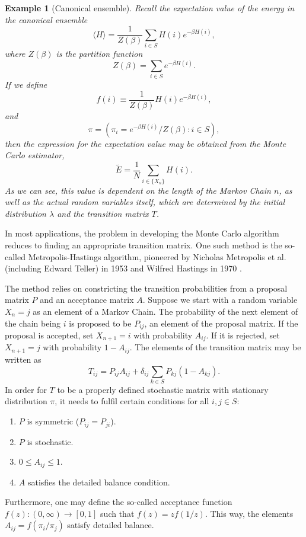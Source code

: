 \documentclass[]{article}
\numberwithin{equation}{section}
\theoremstyle{break}
\newtheorem*{example}{Example}
\newcommand{\bk}{\par\null\par\noindent}
\begin{document}
    \begin{example}[Canonical ensemble]
    Recall the expectation value of the energy in the canonical ensemble
    \[\langle H \rangle = \frac{1}{Z(\beta)}\sum_{i\in S}H(i)e^{-\beta H(i)},\]
    where $Z(\beta)$ is the partition function
    \[Z(\beta) = \sum_{i\in S}e^{-\beta H(i)}.\]
    If we define
    \[f(i) \equiv \frac{1}{Z(\beta)} H(i)e^{-\beta H(i)}, \]
    and
    \[\pi = (\pi_i = e^{-\beta H(i)}/Z(\beta): i\in S),\]
    then the expression for the expectation value may be obtained from the Monte Carlo estimator,
    \[\tilde{E} = \frac{1}{N}\sum_{i\in\{X_n\}}H(i).\]
    As we can see, this value is dependent on the length of the Markov Chain $n$, as well as the actual random variables itself, which are determined by the initial distribution $\lambda$ and the transition matrix $T$.
    \end{example}
\bk
    In most applications, the problem in developing the Monte Carlo algorithm reduces to finding an appropriate transition matrix. One such method is the so-called Metropolis-Hastings algorithm, pioneered by Nicholas Metropolis et al. (including Edward Teller) in 1953 \cite{metropolis-1953} and Wilfred Hastings in 1970 \cite{hastings-1970}. 
    \bk The method relies on constricting the transition probabilities from a proposal matrix $P$ and an acceptance matrix $A$. Suppose we start with a random variable $X_n = j$ as an element of a Markov Chain. The probability of the next element of the chain being $i$ is proposed to be $P_{ij}$, an element of the proposal matrix. If the proposal is accepted, set $X_{n+1} = i$ with probability $A_{ij}$. If it is rejected, set $X_{n+1} = j$ with probability $1-A_{ij}.$ The elements of the transition matrix may be written as
    \begin{equation}
    T_{ij} = P_{ij}A_{ij} + \delta_{ij} \sum_{k\in S}P_{kj}(1-A_{kj}).
    \label{eq:T_mat}
    \end{equation}
In order for $T$ to be a properly defined stochastic matrix with stationary distribution $\pi$, it needs to fulfil certain conditions for all $i, j \in S$:
\begin{enumerate}
    \item $P$ is symmetric ($P_{ij} = P_{ji}$).
    \item $P$ is stochastic.
    \item $0 \leq A_{ij} \leq 1$.
    \item $A$ satisfies the detailed balance condition.
\end{enumerate}
Furthermore, one may define the so-called acceptance function $f(z): (0, \infty) \rightarrow [0,1] $ such that $f(z) = z f(1/z)$. This way, the elements $A_{ij} = f(\pi_i/\pi_j)$ satisfy detailed balance.
\bk 
\end{document}
